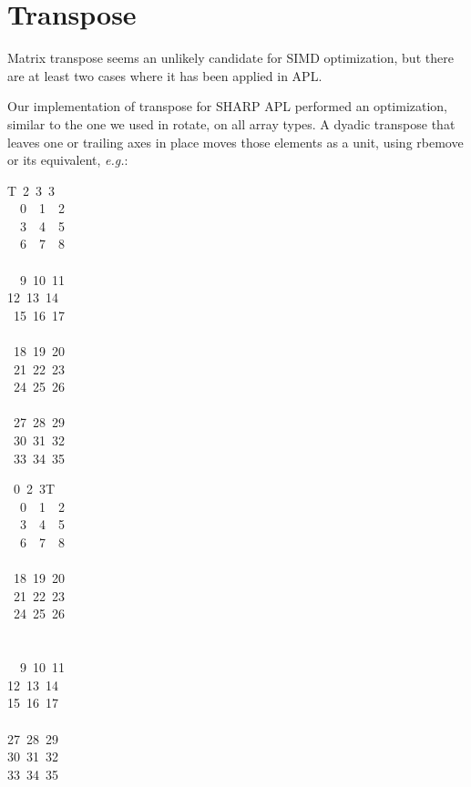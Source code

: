 \section{Transpose}
\label{transpose}

Matrix transpose seems an unlikely candidate for
SIMD optimization, but there are at least two cases
where it has been applied in APL.

Our implementation of transpose for SHARP APL performed
an optimization, similar to the one we used in rotate, on 
all array types. A dyadic transpose that leaves one or
trailing axes in place moves those elements as a unit,
using rbemove or its equivalent, {\em e.g.}:

\medskip

{\apl T\qlarrow{}~2~3~3\qrho\qiota{}\\
~~0~~1~~2\\
~~3~~4~~5\\
~~6~~7~~8\\
\\
~~9~10~11\\
12~13~14\\
~15~16~17\\\
\\
~18~19~20\\
~21~22~23\\
~24~25~26\\
\\
~27~28~29\\
~30~31~32\\
~33~34~35\\}


{~0~2~3\qtran\0T\\
~~0~~1~~2\\
~~3~~4~~5\\
~~6~~7~~8\\
~\\
~18~19~20\\
~21~22~23\\
~24~25~26\\
~\\
~\\
~~9~10~11\\
12~13~14\\
15~16~17\\\
\\
27~28~29\\
30~31~32\\
33~34~35\\}

